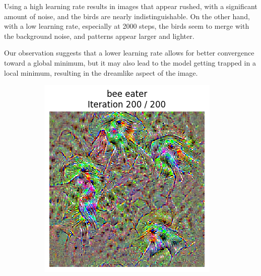 Using a high learning rate results in images that appear rushed, with a significant amount of noise, and the birds are nearly indistinguishable. On the other hand, with a low learning rate, especially at 2000 steps, the birds seem to merge with the background noise, and patterns appear larger and lighter.

Our observation suggests that a lower learning rate allows for better convergence toward a global minimum, but it may also lead to the model getting trapped in a local minimum, resulting in the dreamlike aspect of the image.

\begin{figure}[H]
    \centering
    \begin{subfigure}[t]{.33\textwidth}
        \centering
        \includegraphics[width=\linewidth]{figs_propre2/SqueezeNet/SqueezeNet_bird_animated_lr_10_last_frame.png}
        \caption{}
        \label{fig:class_viz_lr:sub1}
    \end{subfigure}%
    \begin{subfigure}[t]{.33\textwidth}
        \centering

\end{subfigure}
\end{figure}
